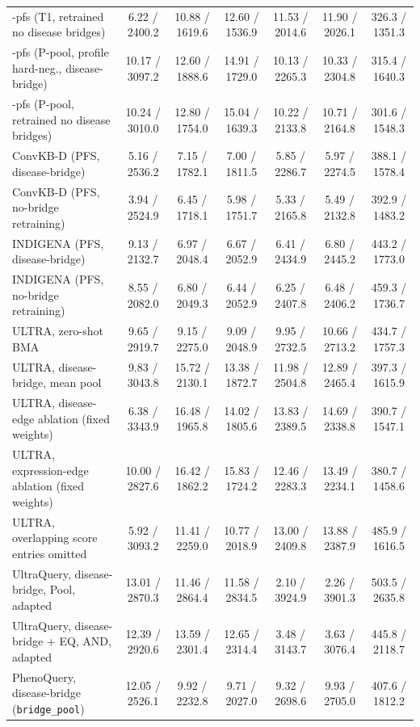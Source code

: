 \begin{table}[tb]
\begin{tabular}{lcccccc}
\method{}-pfs (T1, retrained no disease bridges) & 6.22 / 2400.2 & 10.88 / 1619.6 & 12.60 / 1536.9 & 11.53 / 2014.6 & 11.90 / 2026.1 & 326.3 / 1351.3 \\
\method{}-pfs (P-pool, profile hard-neg., disease-bridge) & 10.17 / 3097.2 & 12.60 / 1888.6 & 14.91 / 1729.0 & 10.13 / 2265.3 & 10.33 / 2304.8 & 315.4 / 1640.3 \\
\method{}-pfs (P-pool, retrained no disease bridges) & 10.24 / 3010.0 & 12.80 / 1754.0 & 15.04 / 1639.3 & 10.22 / 2133.8 & 10.71 / 2164.8 & 301.6 / 1548.3 \\
ConvKB-D (PFS, disease-bridge) & 5.16 / 2536.2 & 7.15 / 1782.1 & 7.00 / 1811.5 & 5.85 / 2286.7 & 5.97 / 2274.5 & 388.1 / 1578.4 \\
ConvKB-D (PFS, no-bridge retraining) & 3.94 / 2524.9 & 6.45 / 1718.1 & 5.98 / 1751.7 & 5.33 / 2165.8 & 5.49 / 2132.8 & 392.9 / 1483.2 \\
INDIGENA (PFS, disease-bridge) & 9.13 / 2132.7 & 6.97 / 2048.4 & 6.67 / 2052.9 & 6.41 / 2434.9 & 6.80 / 2445.2 & 443.2 / 1773.0 \\
INDIGENA (PFS, no-bridge retraining) & 8.55 / 2082.0 & 6.80 / 2049.3 & 6.44 / 2052.9 & 6.25 / 2407.8 & 6.48 / 2406.2 & 459.3 / 1736.7 \\
ULTRA, zero-shot BMA & 9.65 / 2919.7 & 9.15 / 2275.0 & 9.09 / 2048.9 & 9.95 / 2732.5 & 10.66 / 2713.2 & 434.7 / 1757.3 \\
ULTRA, disease-bridge, mean pool & 9.83 / 3043.8 & 15.72 / 2130.1 & 13.38 / 1872.7 & 11.98 / 2504.8 & 12.89 / 2465.4 & 397.3 / 1615.9 \\
ULTRA, disease-edge ablation (fixed weights) & 6.38 / 3343.9 & 16.48 / 1965.8 & 14.02 / 1805.6 & 13.83 / 2389.5 & 14.69 / 2338.8 & 390.7 / 1547.1 \\
ULTRA, expression-edge ablation (fixed weights) & 10.00 / 2827.6 & 16.42 / 1862.2 & 15.83 / 1724.2 & 12.46 / 2283.3 & 13.49 / 2234.1 & 380.7 / 1458.6 \\
ULTRA, overlapping score entries omitted & 5.92 / 3093.2 & 11.41 / 2259.0 & 10.77 / 2018.9 & 13.00 / 2409.8 & 13.88 / 2387.9 & 485.9 / 1616.5 \\
UltraQuery, disease-bridge, Pool, adapted & 13.01 / 2870.3 & 11.46 / 2864.4 & 11.58 / 2834.5 & 2.10 / 3924.9 & 2.26 / 3901.3 & 503.5 / 2635.8 \\
UltraQuery, disease-bridge + EQ, AND, adapted & 12.39 / 2920.6 & 13.59 / 2301.4 & 12.65 / 2314.4 & 3.48 / 3143.7 & 3.63 / 3076.4 & 445.8 / 2118.7 \\
PhenoQuery, disease-bridge (\texttt{bridge\_pool}) & 12.05 / 2526.1 & 9.92 / 2232.8 & 9.71 / 2027.0 & 9.32 / 2698.6 & 9.93 / 2705.0 & 407.6 / 1812.2 \\

\end{tabular}
\end{table}
